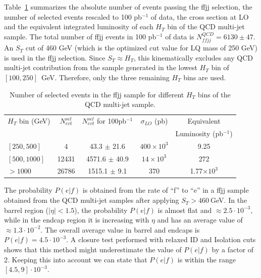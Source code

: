 Table~\ref{tab:ffjjSelection} summarizes 
the absolute number of events passing the ffjj selection, the number 
of selected events rescaled to 100 pb$^{-1}$ of data, the cross section at LO 
and the equivalent integrated luminosity of each $H_T$ 
bin of the QCD multi-jet sample. 
The total number of ffjj events in 100 pb$^{-1}$ of data is $N_{ffjj}^{QCD}=6130 \pm 47$.
An $S_{T}$ cut of 460 GeV (which is the optimized cut value for LQ mass of 250 GeV) is used in 
the ffjj selection.
Since $S_{T} \approx H_T$, this kinematically excludes any 
QCD multi-jet contribution from the sample generated in the lowest $H_T$ bin of $[100,250]$~GeV. 
Therefore, only the three remaining $H_T$ bins are used.

\begin{table}[htbp]
\begin{center}
\begin{tabular}{|l|c|c|c|c|}
\hline\hline
 $H_T$ bin (GeV)   & $N_{evt}^{sel}$ & $N_{evt}^{sel}$ for 100pb$^{-1}$ & $\sigma_{LO}$ (pb) & Equivalent           \\
                         &                 &                                  &                    & Luminosity (pb$^{-1}$) \\
\hline\hline
$[250,500]$              &  4              & 43.3    $\pm$ 21.6               & $400 \times 10^3$  &  9.25                \\
$[500,1000]$             &  12431          & 4571.6  $\pm$ 40.9               & $14 \times 10^3$   &  272                 \\
$>1000$                  &  26786          & 1515.1  $\pm$ 9.1                & $370$              &  1.77$\times 10^3$   \\
\hline\hline
\end{tabular}
\end{center}
\caption{Number of selected events in the ffjj sample for different $H_T$ bins of the QCD multi-jet sample.}
\label{tab:ffjjSelection}
\end{table}


The probability $P(e|f)$ is obtained from the rate of ``f'' to ``e'' in a ffjj sample obtained
from the QCD multi-jet samples after applying $S_T>460~$GeV.
In the barrel region ($|\eta|<1.5$), the probability $P(e|f)$ is almost flat and $\approx 2.5 \cdot 10^{-3}$,  
while in the endcap region it is increasing with $\eta$ and has an average value of $\approx 1.3 \cdot 10^{-2}$.
The overall average value in barrel and endcaps is $P(e|f) = 4.5 \cdot 10^{-3}$.
A closure test performed with relaxed ID and Isolation cuts shows 
that this method might underestimate the value of $P(e|f)$ by a factor of 2.
Keeping this into account we can state that $P(e|f)$ is within the range
$[4.5,9] \cdot 10^{-3}$.

